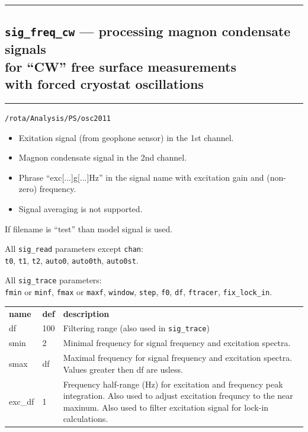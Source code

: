 \documentclass[a4paper]{article}
\begin{document}
\hrule
\subsection*{{\tt sig\_freq\_cw} --- processing magnon condensate signals\\
for ``CW'' free surface measurements\\
with forced cryostat oscillations}
\hrule
\bigskip

\medskip{} {\tt /rota/Analysis/PS/osc2011}

\medskip{}
\begin{itemize}
\item Exitation signal (from geophone sensor) in the 1st channel.
\item Magnon condensate signal in the 2nd channel.
\item Phrase ``exc[...]g[...]Hz'' in the signal name with excitation gain and (non-zero) frequency.
\item Signal averaging is not supported.
\end{itemize}

If filename is ``test'' than model signal is used.

\medskip{}

All {\tt sig\_read} parameters except {\tt chan}:\\
{\tt t0}, {\tt t1}, {\tt t2}, {\tt auto0}, {\tt auto0th}, {\tt auto0st}.

All {\tt sig\_trace} parameters:\\
{\tt fmin} or {\tt minf}, {\tt fmax} or {\tt maxf},
{\tt window}, {\tt step}, {\tt f0}, {\tt df}, {\tt ftracer}, {\tt fix\_lock\_in}.

\medskip\noindent
\begin{tabular}{p{3cm}p{1cm}p{13cm}}\hline
\bf name & \bf def & \bf description\\
df      & 100 & Filtering range (also used in {\tt sig\_trace})\\
smin    & 2   & Minimal frequency for signal frequency and excitation spectra.\\
smax    & df  & Maximal frequency for signal frequency and excitation spectra.
                Values greater then df are usless.\\
exc\_df & 1   & Frequency half-range (Hz) for excitation and frequency peak integration.
                Also used to adjust excitation frequncy to the near maxinum.
                Also used to filter excitation signal for lock-in calculations.\\
\hline
\end{tabular}
\medskip
\end{document}
